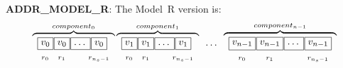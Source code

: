 \textbf{ADDR\_MODEL\_R}: The Model~R version is:
\[
\overbrace{
\begin{array}{cc} \boxed{v_0} \\  _{r_0} \end{array} \mkern-17mu
\begin{array}{cc} \boxed{v_0} \\  _{r_1} \end{array} \mkern-17mu
\begin{array}{cc} \boxed{\ldots\vphantom{v_0}} \\ \phantom{r_2}\end{array} \mkern-22mu
\begin{array}{cc} \boxed{v_0} \\  _{r_{n_s-1}} \end{array}
}^{component_0}
\overbrace{
\begin{array}{cc} \boxed{v_1} \\  _{r_0} \end{array} \mkern-17mu
\begin{array}{cc} \boxed{v_1} \\  _{r_1} \end{array} \mkern-17mu
\begin{array}{cc} \boxed{\ldots\vphantom{v_0}} \\ \phantom{r_2}\end{array} \mkern-22mu
\begin{array}{cc} \boxed{v_1} \\  _{r_{n_s-1}} \end{array}
}^{component_1}
\begin{array}{cc} \ldots \\ \phantom{r_2} \end{array}
\overbrace{
\begin{array}{cc} \boxed{v_{n-1}} \\  _{r_0} \end{array} \mkern-17mu
\begin{array}{cc} \boxed{v_{n-1}} \\  _{r_1} \end{array} \mkern-17mu
\begin{array}{cc} \boxed{\ldots\vphantom{v_{n-1}}} \\ \phantom{r_2}\end{array} \mkern-17mu
\begin{array}{cc} \boxed{v_{n-1}} \\  _{r_{n_s-1}} \end{array}
}^{component_{n-1}}
\]

